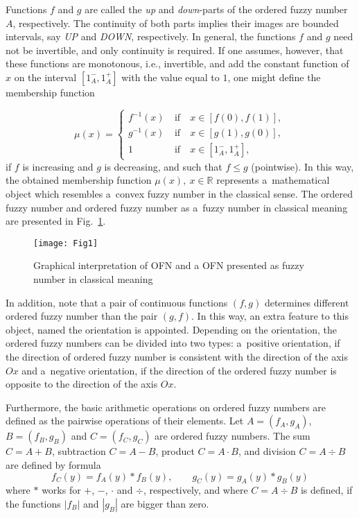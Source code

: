 \documentclass[review]{elsarticle}
\theoremstyle{definition}
\theoremstyle{theorem}
\begin{document}
Functions $f$ and $g$ are called the \emph{up} and \emph{down}-parts of the ordered fuzzy number $A$, respectively. The continuity of both parts implies their images are bounded intervals, say \emph{UP} and \emph{DOWN}, respectively. In general, the functions $f$ and $g$ need not be invertible, and only continuity is required. If one assumes, however, that these functions are monotonous, i.e., invertible, and add the constant function of $x$ on the interval $[1_A^-,1_A^+]$ with the value equal to $1$, one might define the membership function

\begin{equation}
\label{eq:1}
\mu(x)=\left\{
\begin{array}{ccl}
f^{-1}(x) &\ \mathrm{ if }\ & x\in[f(0),f(1)],\\
g^{-1}(x) &\ \mathrm{ if }\ & x\in[g(1),g(0)],\\
1&\ \mathrm{ if }\ &x\in[1_A^-,1_A^+],
\end{array}
\right.
\end{equation}
if $f$ is increasing and $g$ is decreasing, and such that $f\leq g$ (pointwise). In this way, the obtained membership function $\mu(x),\ x\in\mathbb{R}$ represents a~mathematical object which resembles a~convex fuzzy number in the classical sense. The ordered fuzzy number and ordered fuzzy number as a~fuzzy number in classical meaning are presented in Fig.~\ref{fig:1}.

\begin{figure}[!ht]
\centering
\texttt{[image: Fig1]}
\vspace{-25pt}
\caption{Graphical interpretation of OFN and a OFN presented as fuzzy number in classical meaning}
\label{fig:1}
\end{figure}

In addition, note that a pair of continuous functions $(f,g)$ determines different ordered fuzzy number than the pair $(g,f)$. In this way, an extra feature to this object, named the orientation is appointed. Depending on the orientation, the ordered fuzzy numbers can be divided into two types: a~positive orientation, if the direction of ordered fuzzy number is consistent with the direction of the axis $Ox$ and a~negative orientation, if the direction of the ordered fuzzy number is opposite to the direction of the axis $Ox$.

Furthermore, the basic arithmetic operations on ordered fuzzy numbers are defined as the pairwise operations of their elements. Let $A=(f_A,g_A)$, \linebreak $B=(f_B,g_B)$ and $C=(f_C,g_C)$ are ordered fuzzy numbers. The sum \linebreak $C=A+B$, subtraction $C=A-B$, product $C= A\cdot B$, and division $C=A\div B$ are defined by formula
\begin{equation}
f_C(y)=f_A(y)\ast f_B(y),\qquad g_C(y)=g_A(y)\ast g_B(y)
\end{equation}
where $\ast$ works for $+$, $-$, $\cdot$ and $\div$, respectively, and where $C=A\div B$ is defined, if the functions $|f_B|$ and $|g_B|$ are bigger than zero. 
\end{document}
